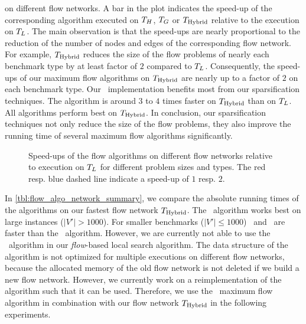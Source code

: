 on different flow networks. A bar in the plot indicates the speed-up of the corresponding algorithm
executed on $T_H$, $T_G$ or $T_{\text{Hybrid}}$ relative to the execution on $T_L$.
The main observation is that the speed-ups are nearly proportional to the reduction of the number
of nodes and edges of the corresponding flow network. For example, $T_{\text{Hybrid}}$ reduces the size
of the flow problems of nearly each benchmark type by at least factor of $2$ compared to $T_L$. Consequently,
the speed-ups of our maximum flow algorithms on $T_{\text{Hybrid}}$ are nearly up to a factor of $2$ on each
benchmark type. Our \GoldbergTarjan~implementation benefits most from our sparsification 
techniques. The algorithm is around $3$ to $4$ times faster on $T_{\text{Hybrid}}$ than on 
$T_L$. All algorithms perform best on $T_{\text{Hybrid}}$. In conclusion, our
sparsification techniques not only reduce the size of the flow problems, they also
improve the running time of several maximum flow algorithms significantly.\\
\begin{figure}
\centering
\caption{Speed-ups of the flow algorithms on different flow networks relative to execution on
         $T_L$ for different problem sizes and types. The red resp. blue dashed line 
         indicate a speed-up of $1$ resp. $2$.}
\label{fig:max_flow_network_algo}
\end{figure} 
In \autoref{tbl:flow_algo_network_summary}, we compare the absolute running times of the 
algorithms on our fastest flow network $T_{\text{Hybrid}}$. The \IBFS~algorithm works best on
large instances ($|V'| > 1000$). For smaller benchmarks ($|V'| \le 1000$) 
\BoykovKolmogorov~and \EdmondKarp~are faster than the \IBFS~algorithm. 
However, we are currently not able to use the \IBFS~algorithm
in our \emph{flow}-based local search algorithm. The data structure of the algorithm
is not optimized for multiple executions on different flow networks, because the allocated 
memory of the old flow network is not deleted if we build a new flow network. 
However, we currently work on a reimplementation
of the algorithm such that it can be used. Therefore, we use the \BoykovKolmogorov~maximum 
flow algorithm in combination with our flow network $T_{\text{Hybrid}}$ in the following experiments.
